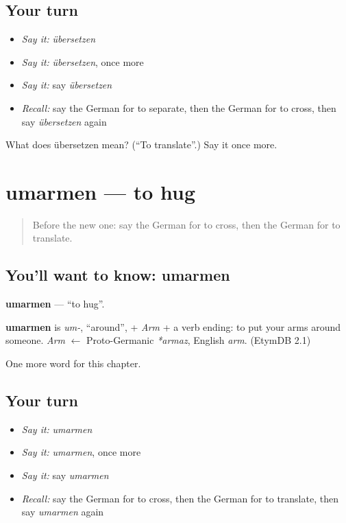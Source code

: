 \subsection*{Your turn}
\begin{itemize}
\raggedright
  \item \emph{Say it:} \emph{übersetzen}
  \item \emph{Say it:} \emph{übersetzen}, once more
  \item \emph{Say it:} say \emph{übersetzen}
  \item \emph{Recall:} say the German for to separate, then the German for to cross, then say \emph{übersetzen} again
\end{itemize}

\begin{tcolorbox}[breakable,colback=teal!4,colframe=teal!35!black,title={Before you move on}]
What does übersetzen mean? (\textquotedblleft{}To translate\textquotedblright{}.) Say it once more.
\end{tcolorbox}
\section[umarmen]{umarmen — to hug}

\label{lesson:GE-C189-umarmen}



\begin{quote}
Before the new one: say the German for to cross, then the German for to translate.
\end{quote}

\subsection*{You'll want to know: umarmen}
\textbf{umarmen} — \textquotedblleft{}to hug\textquotedblright{}.

\begin{cousinweb}
\textbf{umarmen} is \emph{um-}, \textquotedblleft{}around\textquotedblright{}, + \emph{Arm} + a verb ending: to put your arms around someone. \emph{Arm} $\leftarrow$ Proto-Germanic \emph{*armaz}, English \emph{arm}. (EtymDB 2.1)
\end{cousinweb}

\begin{grammarlens}[title={What you've built}]
One more word for this chapter.
\end{grammarlens}

\subsection*{Your turn}
\begin{itemize}
\raggedright
  \item \emph{Say it:} \emph{umarmen}
  \item \emph{Say it:} \emph{umarmen}, once more
  \item \emph{Say it:} say \emph{umarmen}
  \item \emph{Recall:} say the German for to cross, then the German for to translate, then say \emph{umarmen} again
\end{itemize}

